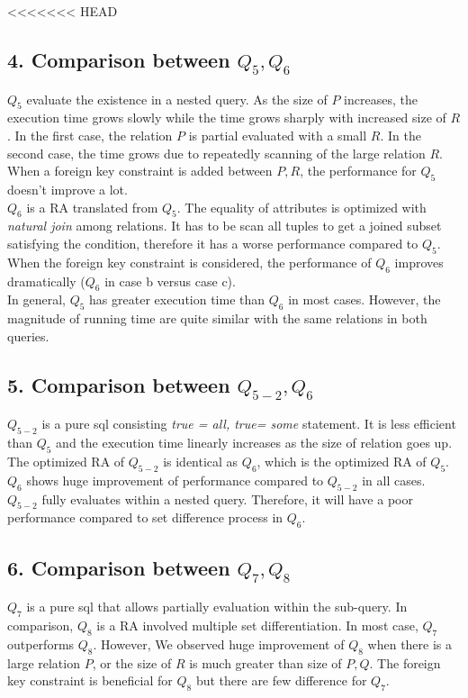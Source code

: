 \documentclass[10pt]{article}
\begin{document}
<<<<<<< HEAD
\subsection*{4. Comparison between $Q_5,  Q_6$}
$Q_5$ evaluate the existence in a nested query. As the size of $P$ increases, the execution time grows slowly while the time grows sharply with increased size of $R$. In the first case, the relation $P$ is partial evaluated with a small $R$. In the second case, the time grows due to repeatedly scanning of the large relation $R$. When a foreign key constraint is added between $P, R$, the performance for $Q_5$ doesn't improve a lot.\\
$Q_6$ is a RA translated from $Q_5$. The equality of attributes is optimized with \textit{natural join} among relations. It has to be scan all tuples to get a joined subset satisfying the condition, therefore it has a worse performance compared to $Q_5$. When the foreign key constraint is considered, the performance of $Q_6$ improves dramatically ($Q_6$ in case b versus case c).\\
In general, $Q_5$ has greater execution time than $Q_6$ in most cases. However, the magnitude of running time are quite similar with the same relations in both queries.
\subsection*{5. Comparison between $Q_{5-2},  Q_6$}
$Q_{5-2}$ is a pure sql consisting \textit{true = all, true= some} statement. It is less efficient than $Q_5$ and the execution time linearly increases as the size of relation goes up. The optimized RA of $Q_{5-2}$ is identical as $Q_6$, which is the optimized RA of $Q_5$. $Q_6$ shows huge improvement of performance compared to $Q_{5-2}$ in all cases.\\
$Q_{5-2}$ fully evaluates within a nested query. Therefore, it will have a poor performance compared to set difference process in $Q_6$.
\subsection*{6. Comparison between $Q_7,  Q_8$}
$Q_7$ is a pure sql that allows partially evaluation within the sub-query. In comparison, $Q_8$ is a RA involved multiple set differentiation. In most case, $Q_7$ outperforms $Q_8$. However, We observed huge improvement of $Q_8$ when there is a large relation $P$, or the size of $R$ is much greater than size of $P, Q$. The foreign key constraint is beneficial for $Q_8$ but there are few difference for $Q_7$.
\end{document}
